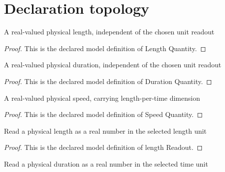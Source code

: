 \section{Declaration topology}
\begin{definition}
  \label{def:physics:phyx-mini-0215:phyxminiproblems-problemphyxmini0215-lengthquantity}
  A real-valued physical length, independent of the chosen unit readout
\end{definition}
\begin{proof}
  This is the declared model definition of Length Quantity.
\end{proof}
\begin{definition}
  \label{def:physics:phyx-mini-0215:phyxminiproblems-problemphyxmini0215-durationquantity}
  A real-valued physical duration, independent of the chosen unit readout
\end{definition}
\begin{proof}
  This is the declared model definition of Duration Quantity.
\end{proof}
\begin{definition}
  \label{def:physics:phyx-mini-0215:phyxminiproblems-problemphyxmini0215-speedquantity}
  A real-valued physical speed, carrying length-per-time dimension
\end{definition}
\begin{proof}
  This is the declared model definition of Speed Quantity.
\end{proof}
\begin{definition}
  \label{def:physics:phyx-mini-0215:phyxminiproblems-problemphyxmini0215-lengthreadout}
  Read a physical length as a real number in the selected length unit
\end{definition}
\begin{proof}
  This is the declared model definition of length Readout.
\end{proof}
\begin{definition}
  \label{def:physics:phyx-mini-0215:phyxminiproblems-problemphyxmini0215-durationreadout}
  Read a physical duration as a real number in the selected time unit
\end{definition}
